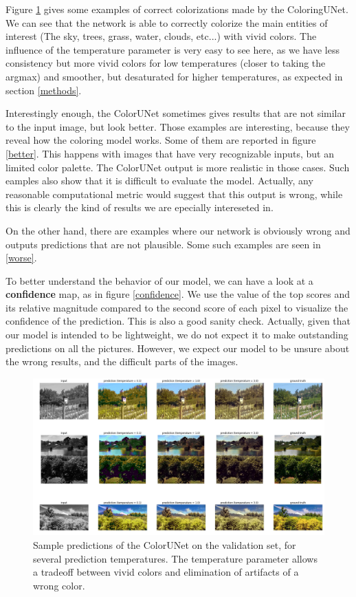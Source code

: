\documentclass[10pt,twocolumn,letterpaper]{article}
\begin{document}
Figure \ref{good} gives some examples of correct colorizations made by the ColoringUNet. We can see that the network is able to correctly colorize the main entities of interest (The sky, trees, grass, water, clouds, etc...) with vivid colors. The influence of the temperature parameter is very easy to see here, as we have less consistency but more vivid colors for low temperatures (closer to taking the argmax) and smoother, but desaturated for higher temperatures, as expected in section \ref{methods}.

Interestingly enough, the ColorUNet sometimes gives results that are not similar to the input image, but look better. Those examples are interesting, because they reveal how the coloring model works. Some of them are reported in figure \ref{better}. This happens with images that have very recognizable inputs, but an limited color palette. The ColorUNet output is more realistic in those cases.
Such eamples also show that it is difficult to evaluate the model. Actually, any reasonable computational metric would suggest that this output is wrong, while this is clearly the kind of results we are epecially intereseted in.

On the other hand, there are examples where our network is obviously wrong and outputs predictions that are not plausible. Some such examples are seen in \ref{worse}.

To better understand the behavior of our model, we can have a look at a \textbf{confidence} map, as in figure \ref{confidence}. We use the value of the top scores and its relative magnitude compared to the second score of each pixel to visualize the confidence of the prediction. This is also a good sanity check. Actually, given that our model is intended to be lightweight, we do not expect it to make outstanding predictions on all the pictures. However, we expect our model to be unsure about the wrong results, and the difficult parts of the images.  

\begin{figure}
\begin{center}
\includegraphics[width=450px]{good}
\caption{Sample predictions of the ColorUNet on the validation set, for several prediction temperatures. The temperature parameter allows a tradeoff between vivid colors and elimination of artifacts of a wrong color.}
\label{good}
\end{center}
\end{figure}
\end{document}
